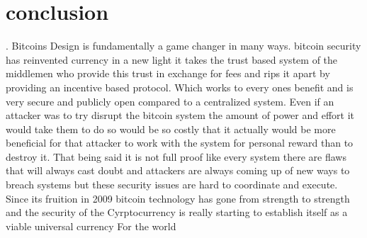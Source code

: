 \documentclass[report]{IEEEtran}
\begin{document}
\section{conclusion}.\newline
Bitcoins Design is fundamentally a game changer in many ways. bitcoin security has reinvented currency in a new light it takes the trust based system of the middlemen who provide this trust in exchange for fees and rips it apart by providing an incentive based protocol. Which works to every ones benefit and is very secure and publicly open compared to a centralized system. Even if an attacker was to try disrupt the bitcoin system the amount of power and effort it would take them to do so would be so costly that it actually would be more beneficial for that attacker to work with the system for personal reward than to destroy it. That being said it is not full proof like every system there are flaws that will always cast doubt and attackers are always coming up of new ways to breach systems but these security issues are hard to coordinate and execute. Since its fruition in 2009 bitcoin technology has gone from strength to strength and the security of the Cyrptocurrency is really starting to establish itself as a viable universal currency For the world         
\end{document}
